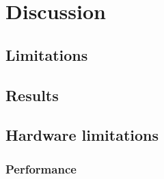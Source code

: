 \chapter{Discussion}

\section{Limitations}



\section{Results}


\section{Hardware limitations}

\subsection{Performance}\label{chap:discussperformance}

